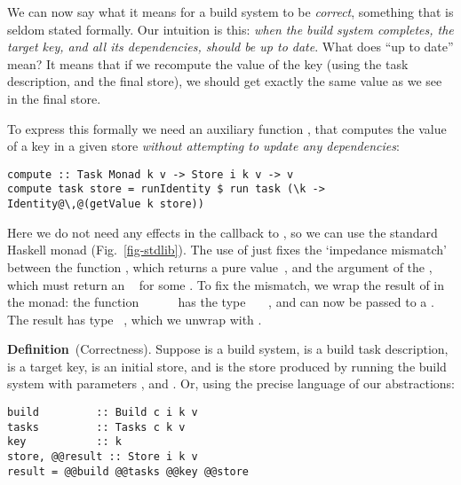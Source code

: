 We can now say what it means for a build system to be \emph{correct}, something
that is seldom stated formally. Our intuition is this: \emph{when the build
system completes, the target key, and all its dependencies, should be up to
date}. What does ``up to date'' mean? It means that if we recompute the value of
the key (using the task description, and the final store), we should get exactly
the same value as we see in the final store.

To express this formally we need an auxiliary function , that
computes the value of a key in a given store \emph{without attempting to update
any dependencies}:

\begin{verbatim}
compute :: Task Monad k v -> Store i k v -> v
compute task store = runIdentity $ run task (\k -> Identity@\,@(getValue k store))
\end{verbatim}

\noindent
Here we do not need any effects in the  callback to , so
we can use the standard Haskell  monad (Fig.~\ref{fig-stdlib}).
The use of  just fixes the `impedance mismatch' between the
function , which returns a pure value~, and the 
argument of the , which must return an ~ for some .
To fix the mismatch, we wrap the result of  in the 
monad: the function
\hs{\@@k}~\hs{->}~~~~ has the type
~\hs{->}~~, and can now be passed to a . The
result has type ~, which we unwrap with .


\textbf{Definition}~(Correctness). Suppose  is a build system,
 is a build task description,  is a target key,  is
an initial store, and  is the store produced by running the build
system with parameters ,  and . Or, using the
precise language of our abstractions:

\begin{verbatim}
build         :: Build c i k v
tasks         :: Tasks c k v
key           :: k
store, @@result :: Store i k v
result = @@build @@tasks @@key @@store
\end{verbatim}

